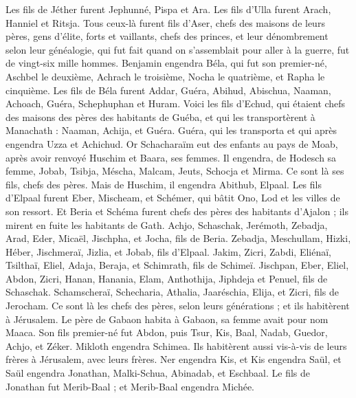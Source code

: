 \begin{multicols}{2}
Les fils de Jéther furent Jephunné, Pispa et Ara.
Les fils d'Ulla furent Arach, Hanniel et Ritsja.
Tous ceux-là furent fils d'Aser, chefs des maisons de leurs pères, gens d'élite, forts et vaillants, chefs des princes, et leur dénombrement selon leur généalogie, qui fut fait quand on s'assemblait pour aller à la guerre, fut de vingt-six mille hommes.
\VerseOne{}Benjamin engendra Béla, qui fut son premier-né, Aschbel le deuxième, Achrach le troisième,
Nocha le quatrième, et Rapha le cinquième.
Les fils de Béla furent Addar, Guéra, Abihud,
Abischua, Naaman, Achoach,
Guéra, Schephuphan et Huram.
Voici les fils d'Echud, qui étaient chefs des maisons des pères des habitants de Guéba, et qui les transportèrent à Manachath :
Naaman, Achija, et Guéra. Guéra, qui les transporta et qui après engendra Uzza et Achichud.
Or Schacharaïm eut des enfants au pays de Moab, après avoir renvoyé Huschim et Baara, ses femmes.
Il engendra, de Hodesch sa femme, Jobab, Tsibja, Méscha, Malcam,
Jeuts, Schocja et Mirma. Ce sont là ses fils, chefs des pères.
Mais de Huschim, il engendra Abithub, Elpaal.
Les fils d'Elpaal furent Eber, Mischeam, et Schémer, qui bâtit Ono, Lod et les villes de son ressort.
Et Beria et Schéma furent chefs des pères des habitants d'Ajalon ; ils mirent en fuite les habitants de Gath.
Achjo, Schaschak, Jerémoth,
Zebadja, Arad, Eder,
Micaël, Jischpha, et Jocha, fils de Beria.
Zebadja, Meschullam, Hizki, Héber,
Jischmeraï, Jizlia, et Jobab, fils d'Elpaal.
Jakim, Zicri, Zabdi,
Eliénaï, Tsilthaï, Eliel,
Adaja, Beraja, et Schimrath, fils de Schimeï.
Jischpan, Eber, Eliel,
Abdon, Zicri, Hanan,
Hanania, Elam, Anthothija,
Jiphdeja et Penuel, fils de Schaschak.
Schamscheraï, Schecharia, Athalia,
Jaaréschia, Elija, et Zicri, fils de Jerocham.
Ce sont là les chefs des pères, selon leurs générations ; et ils habitèrent à Jérusalem.
Le père de Gabaon habita à Gabaon, sa femme avait pour nom Maaca.
Son fils premier-né fut Abdon, puis Tsur, Kis, Baal, Nadab,
Guedor, Achjo, et Zéker.
Mikloth engendra Schimea. Ils habitèrent aussi vis-à-vis de leurs frères à Jérusalem, avec leurs frères.
Ner engendra Kis, et Kis engendra Saül, et Saül engendra Jonathan, Malki-Schua, Abinadab, et Eschbaal.
Le fils de Jonathan fut Merib-Baal ; et Merib-Baal engendra Michée.

\end{multicols}
